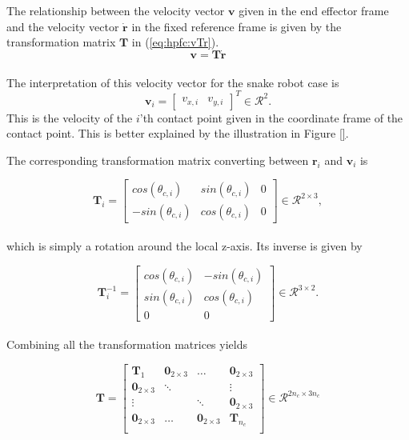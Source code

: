 The relationship between the velocity vector $\mathbf{v}$ given in the end effector frame and the velocity vector $\dot{\mathbf{r}}$ in the fixed reference frame is given by the transformation matrix $\mathbf{T}$ in (\ref{eq:hpfc:vTr}).
\begin{equation}\label{eq:hpfc:vTr}
    \mathbf{v = T\dot{r}}
\end{equation}
\\
The interpretation of this velocity vector for the snake robot case is
\begin{equation}
    \mathbf{v}_i = 
    \begin{bmatrix}
        v_{x,i} & v_{y,i}
    \end{bmatrix}^T \in \mathcal{R}^2.
\end{equation}
This is the velocity of the $i$'th contact point given in the coordinate frame of the contact point. This is better explained by the illustration in Figure \ref{}.

The corresponding transformation matrix converting between $\mathbf{r}_i$ and $\mathbf{v}_i$ is

\begin{equation} \label{eq:dhpfc_Ti}
    \mathbf{T}_i =
    \begin{bmatrix}
        cos(\theta_{c,i}) & sin(\theta_{c,i}) & 0 \\
        -sin(\theta_{c,i}) & cos(\theta_{c,i}) & 0
    \end{bmatrix} \in \mathcal{R}^{2 \times 3},
\end{equation}
\\
which is simply a rotation around the local z-axis. Its inverse is given by

\begin{equation}\label{eq:Tinv}
    \mathbf{T}^{-1}_i =
    \begin{bmatrix}
        cos(\theta_{c,i}) & -sin(\theta_{c,i}) \\
        sin(\theta_{c,i}) & cos(\theta_{c,i}) \\
        0 & 0
    \end{bmatrix} \in \mathcal{R}^{3 \times 2}.
\end{equation}
\\
Combining all the transformation matrices yields

\begin{equation}
    \mathbf{T} =
    \begin{bmatrix}
        \mathbf{T}_1 & \mathbf{0}_{2\times3} & \dots & \mathbf{0}_{2\times3} \\
        \mathbf{0}_{2\times3} & \ddots & & \vdots \\
        \vdots & & \ddots & \mathbf{0}_{2\times3} \\
        \mathbf{0}_{2\times3} & \dots & \mathbf{0}_{2\times3} & \mathbf{T}_{n_c} \\
    \end{bmatrix} \in \mathcal{R}^{2 n_c \times 3 n_c}
\end{equation}
\\

